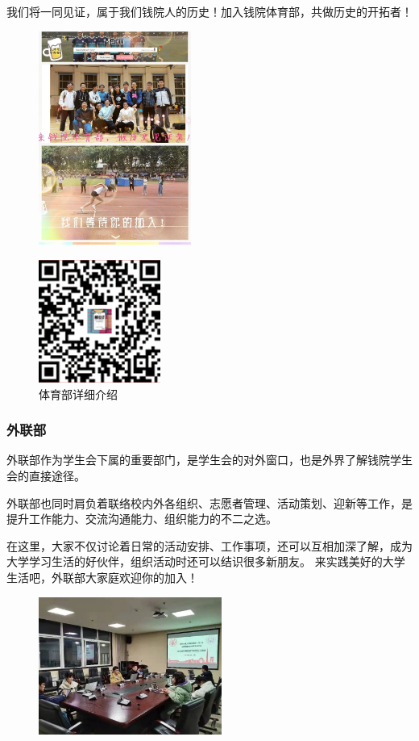 \documentclass[
decoration,  %
]{qyxf-book}
\begin{document}
    我们将一同见证，属于我们钱院人的历史！加入钱院体育部，共做历史的开拓者！
	\newpage
	\begin{figure}[htbp]
		\centering
		\includegraphics[align=c,width=5cm]{pics/gym.png}
		\end{figure}

	\begin{figure}[htbp]
	\centering
	\includegraphics[align=c,width=4cm]{pics/gymqrcode.png}
	\vspace{-2cm}
	\setlength{\abovecaptionskip}{2cm}
	\setlength{\belowcaptionskip}{1cm}
	\caption*{体育部详细介绍}
	\end{figure}

	
	\subsubsection{外联部}
	外联部作为学生会下属的重要部门，是学生会的对外窗口，也是外界了解钱院学生会的直接途径。
	
    外联部也同时肩负着联络校内外各组织、志愿者管理、活动策划、迎新等工作，是提升工作能力、交流沟通能力、组织能力的不二之选。
    
    在这里，大家不仅讨论着日常的活动安排、工作事项，还可以互相加深了解，成为大学学习生活的好伙伴，组织活动时还可以结识很多新朋友。
    来实践美好的大学生活吧，外联部大家庭欢迎你的加入！

	\begin{figure}[htbp]
		\centering
		\includegraphics[width=6cm]{pics/wlb.png}
	\end{figure}
\end{document}
